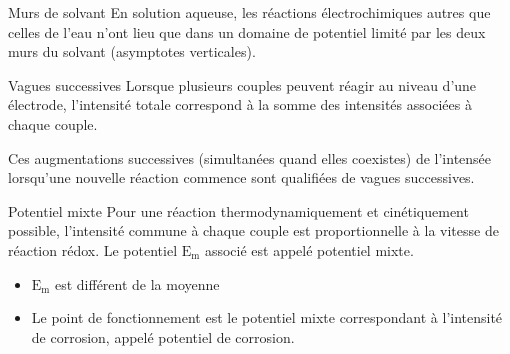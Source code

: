 \documentclass[french, a4paper, 11pt, twocolumn]{article}
\begin{document}
    \begin{cadre}{Murs de solvant}
        En solution aqueuse, les réactions électrochimiques autres que celles de l'eau n'ont lieu que dans
        un domaine de potentiel limité par les deux murs du solvant (asymptotes verticales).
    \end{cadre}

    \begin{cadre}{Vagues successives}
        Lorsque plusieurs couples peuvent réagir au niveau d'une électrode, l'intensité totale correspond à la somme des 
        intensités associées à chaque couple. 
        
        Ces augmentations successives (simultanées quand elles coexistes)
        de l'intensée lorsqu'une nouvelle réaction commence sont qualifiées de vagues successives.
    \end{cadre}

    \begin{cadre}{Potentiel mixte}
        Pour une réaction thermodynamiquement et cinétiquement possible,
        l'intensité commune à chaque couple est proportionnelle à la vitesse de 
        réaction rédox. Le potentiel \(\mathrm{E_m}\) associé est appelé potentiel mixte.
        

        \tcblower
        \begin{itemize}
            \item \(\mathrm{E_m}\) est différent de la moyenne
            \item Le point de fonctionnement est le potentiel mixte correspondant à l'intensité de corrosion,
                appelé potentiel de corrosion.
        \end{itemize}
        
    \end{cadre}
\end{document}
